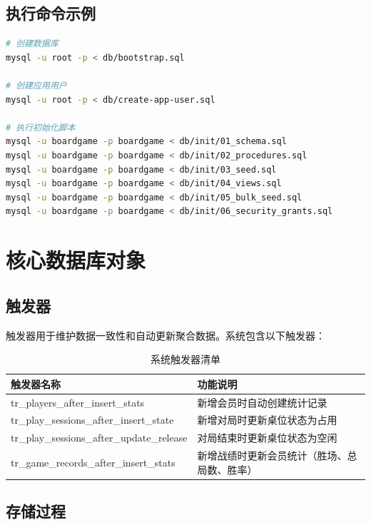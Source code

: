 \subsection{执行命令示例}

\begin{lstlisting}[language=bash, caption=数据库初始化命令]
# 创建数据库
mysql -u root -p < db/bootstrap.sql

# 创建应用用户
mysql -u root -p < db/create-app-user.sql

# 执行初始化脚本
mysql -u boardgame -p boardgame < db/init/01_schema.sql
mysql -u boardgame -p boardgame < db/init/02_procedures.sql
mysql -u boardgame -p boardgame < db/init/03_seed.sql
mysql -u boardgame -p boardgame < db/init/04_views.sql
mysql -u boardgame -p boardgame < db/init/05_bulk_seed.sql
mysql -u boardgame -p boardgame < db/init/06_security_grants.sql
\end{lstlisting}

\section{核心数据库对象}

\subsection{触发器}

触发器用于维护数据一致性和自动更新聚合数据。系统包含以下触发器：

\begin{table}[H]
  \centering
  \caption{系统触发器清单}
  \label{tab:triggers}
  \begin{tabularx}{\textwidth}{|l|X|}
    \hline
    \textbf{触发器名称} & \textbf{功能说明} \\
    \hline
    tr\_players\_after\_insert\_stats & 新增会员时自动创建统计记录 \\
    \hline
    tr\_play\_sessions\_after\_insert\_state & 新增对局时更新桌位状态为占用 \\
    \hline
    tr\_play\_sessions\_after\_update\_release & 对局结束时更新桌位状态为空闲 \\
    \hline
    tr\_game\_records\_after\_insert\_stats & 新增战绩时更新会员统计（胜场、总局数、胜率） \\
    \hline
  \end{tabularx}
\end{table}

\subsection{存储过程}

